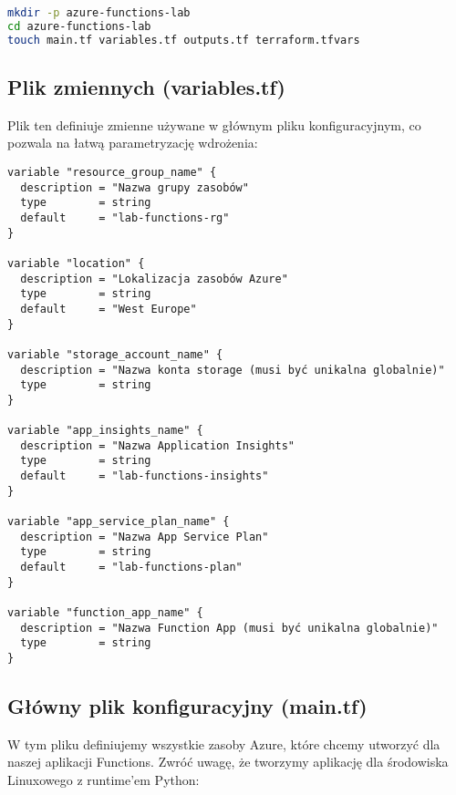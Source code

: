\documentclass{article}
\begin{document}
\begin{lstlisting}[language=bash]
mkdir -p azure-functions-lab
cd azure-functions-lab
touch main.tf variables.tf outputs.tf terraform.tfvars
\end{lstlisting}

\subsection{Plik zmiennych (variables.tf)}

Plik ten definiuje zmienne używane w głównym pliku konfiguracyjnym, co pozwala na łatwą parametryzację wdrożenia:

\begin{lstlisting}[]
variable "resource_group_name" {
  description = "Nazwa grupy zasobów"
  type        = string
  default     = "lab-functions-rg"
}

variable "location" {
  description = "Lokalizacja zasobów Azure"
  type        = string
  default     = "West Europe"
}

variable "storage_account_name" {
  description = "Nazwa konta storage (musi być unikalna globalnie)"
  type        = string
}

variable "app_insights_name" {
  description = "Nazwa Application Insights"
  type        = string
  default     = "lab-functions-insights"
}

variable "app_service_plan_name" {
  description = "Nazwa App Service Plan"
  type        = string
  default     = "lab-functions-plan"
}

variable "function_app_name" {
  description = "Nazwa Function App (musi być unikalna globalnie)"
  type        = string
}
\end{lstlisting}

\subsection{Główny plik konfiguracyjny (main.tf)}

W tym pliku definiujemy wszystkie zasoby Azure, które chcemy utworzyć dla naszej aplikacji Functions. Zwróć uwagę, że tworzymy aplikację dla środowiska Linuxowego z runtime'em Python:
\end{document}
